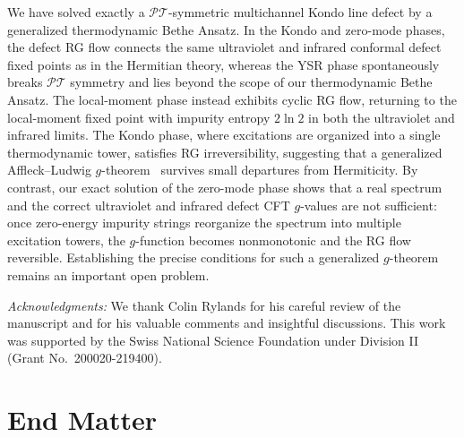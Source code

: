 \documentclass[aps,  prb,twocolumn,
  superscriptaddress,  floatfix,  10pt         
]{revtex4-2}
\begin{document}
We have solved exactly a $\mathscr{PT}$-symmetric multichannel Kondo line defect by a generalized thermodynamic Bethe Ansatz. In the Kondo and zero-mode phases, the defect RG flow connects the same ultraviolet and infrared conformal defect fixed points as in the Hermitian theory, whereas the YSR phase spontaneously breaks $\mathscr{PT}$ symmetry and lies beyond the scope of our thermodynamic Bethe Ansatz. The local-moment phase instead exhibits cyclic RG flow, returning to the local-moment fixed point with impurity entropy $2\ln2$ in both the ultraviolet and infrared limits. The Kondo phase, where excitations are organized into a single thermodynamic tower, satisfies RG irreversibility, suggesting that a generalized Affleck--Ludwig $g$-theorem~\cite{affleck1991universal,friedan2004boundary,casini2016g} survives small departures from Hermiticity. By contrast, our exact solution of the zero-mode phase shows that a real spectrum and the correct ultraviolet and infrared defect CFT $g$-values are not sufficient: once zero-energy impurity strings reorganize the spectrum into multiple excitation towers, the $g$-function becomes nonmonotonic and the RG flow reversible. Establishing the precise conditions for such a generalized $g$-theorem remains an important open problem.

\textit{Acknowledgments:} We thank Colin Rylands for his careful review of the manuscript and for his valuable comments and insightful discussions. This work was supported by the Swiss National Science Foundation under Division II (Grant No.~200020-219400).



\widetext
\section*{End Matter}
\end{document}
